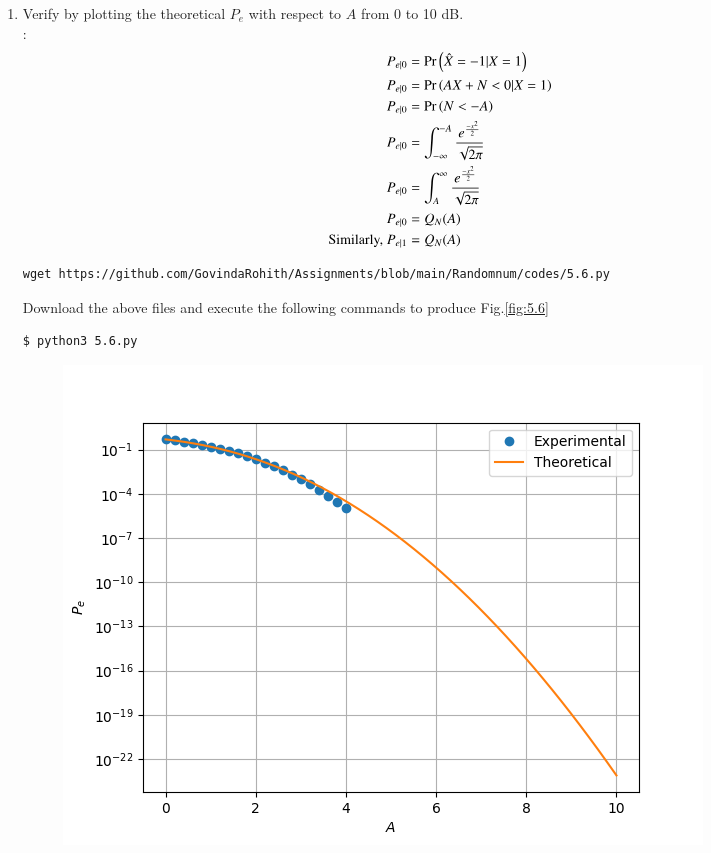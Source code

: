 \documentclass[journal,12pt,twocolumn]{IEEEtran}
\renewcommand\thesection{\arabic{section}}
\begin{document}
\begin{enumerate}[label=\thesection.\arabic*
,ref=\thesection.\theenumi]
\begin{enumerate}[label=\thesection.\arabic*
,ref=\thesection.\theenumi]
\solution
\begin{align}
    P_e=P(X=1)P_{e|0}+P(X=-1)P_{e|1}
\end{align}
Since X is equiprobable
\begin{align}
    P(X=1)=P(X=-1)=0.5\\
    \implies P_e=\frac{P_{e|0}+P_{e|1}}{2}\\
    \implies \boxed{P_e=0.499585}
\end{align}
\item
Verify by plotting  the theoretical $P_e$ with respect to $A$ from 0 to 10 dB.  \\
\solution:
\begin{align}
    P_{e|0}&=\Pr\left(\hat{X}=-1|X=1\right)\\
    P_{e|0}&=\Pr\left(AX+N<0|X=1\right)\\
    P_{e|0}&=\Pr\left(N<-A\right)\\
    P_{e|0}&=\int_{-\infty }^{-A}\frac{e^{\frac{-x^2}{2}}}{\sqrt{2\pi}}\\
    P_{e|0}&=\int_{A }^{\infty}\frac{e^{\frac{-x^2}{2}}}{\sqrt{2\pi}}\\
    P_{e|0}&=Q_N(A)\\
    \text{Similarly, }P_{e|1}&=Q_N(A)
\end{align}
\begin{lstlisting}
wget https://github.com/GovindaRohith/Assignments/blob/main/Randomnum/codes/5.6.py
\end{lstlisting}
Download the above files and execute the following commands to produce Fig.\ref{fig:5.6}
\begin{lstlisting}
$ python3 5.6.py
\end{lstlisting}
\begin{figure}[!h]
\centering
\includegraphics[width=\columnwidth]{./figs/5.6.png}

\end{figure}
\end{enumerate}
\end{enumerate}
\end{document}
